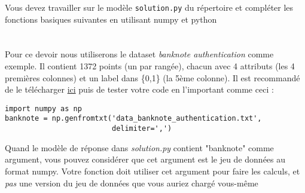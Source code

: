 \documentclass[11pt,french,english]{article}
\begin{document}
{%
{Vous devez travailler sur le modèle \texttt{solution.py} du répertoire et compléter les fonctions basiques suivantes en utilisant numpy et python}%
}


\section*{}

%
{Pour ce devoir nous utiliserons le dataset \emph{banknote authentication} comme exemple. Il contient 1372 points (un par rangée), chacun avec 4 attributs (les 4 premières colonnes) et un label dans \{0,1\} (la 5ème colonne). Il est recommandé de le télécharger \href{https://archive.ics.uci.edu/ml/machine-learning-databases/00267/data_banknote_authentication.txt}{ici} puis de tester votre code en l'important comme ceci :}
\begin{lstlisting}
import numpy as np
banknote = np.genfromtxt('data_banknote_authentication.txt',
                         delimiter=',')
\end{lstlisting}
%
{Quand le modèle de réponse dans \emph{solution.py} contient "banknote" comme argument, vous pouvez considérer que cet argument est le jeu de données au format numpy. Votre fonction doit utiliser cet argument pour faire les calculs, et \emph{pas} une version du jeu de données que vous auriez chargé vous-même}
\end{document}
